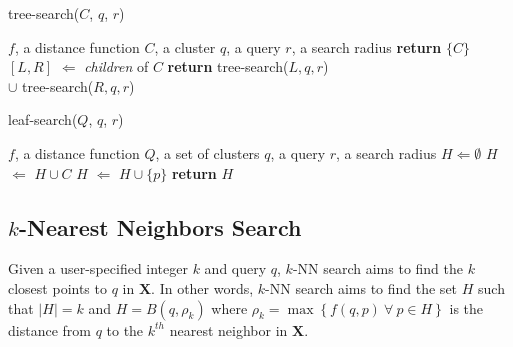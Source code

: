\FloatBarrier
    \begin{algorithm}[!t]
        \caption{tree-search($C$, $q$, $r$)}
        \label{alg:methods:rnn-search:tree-search}
        \begin{algorithmic}[1]
            \REQUIRE $f$, a distance function
            \REQUIRE $C$, a cluster
            \REQUIRE $q$, a query
            \REQUIRE $r$, a search radius
                \STATE \textbf{return} $\{C\}$
            \ELSE
                \STATE $[L, R]$ $\Leftarrow$ \textit{children} of $C$
                \STATE \textbf{return} tree-search($L, q, r$) \\
                 $\cup$ tree-search($R, q, r$)
            \ENDIF
        \end{algorithmic}
    \end{algorithm}

    \begin{algorithm}[!t]
        \caption{leaf-search($Q$, $q$, $r$)}
        \label{alg:methods:rnn-search:leaf-search}
        \begin{algorithmic}[1]
            \REQUIRE $f$, a distance function
            \REQUIRE $Q$, a set of clusters
            \REQUIRE $q$, a query
            \REQUIRE $r$, a search radius
            \STATE $H \Leftarrow \emptyset$
                    \STATE $H$ $\Leftarrow$ $H \cup C$
                \ELSE
                            \STATE $H$ $\Leftarrow$ $H \cup \{p\}$
                        \ENDIF
                    \ENDFOR
                \ENDIF
            \ENDFOR
            \STATE \textbf{return} $H$
        \end{algorithmic}
    \end{algorithm}


\subsection{\texorpdfstring{$k$}{k}-Nearest Neighbors Search}
\label{sec:methods:knn-search}

Given a user-specified integer $k$ and query $q$, $k$-NN search aims to find the $k$ closest points to $q$ in $\textbf{X}$.
In other words, $k$-NN search aims to find the set $H$ such that $|H| = k$ and $H = B(q, \rho_k)$ where $\rho_k = \max \left\{ f(q, p) \ \forall \ p \in H \right\}$ is the distance from $q$ to the $k^{th}$ nearest neighbor in $\textbf{X}$.

